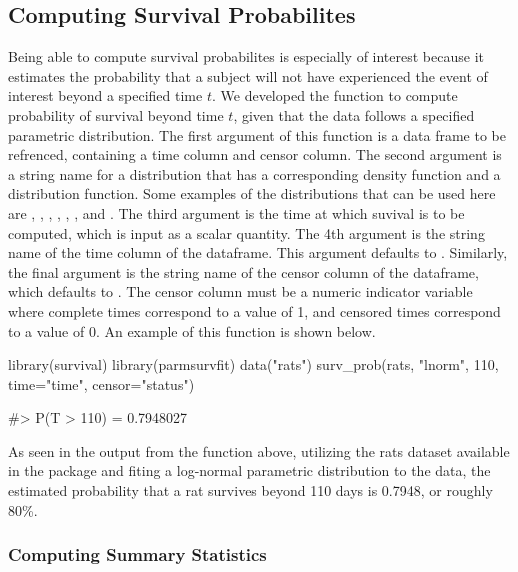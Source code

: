 \hypertarget{computing-survival-probabilites}{%
\subsection{Computing Survival
Probabilites}\label{computing-survival-probabilites}}

Being able to compute survival probabilites is especially of interest
because it estimates the probability that a subject will not have
experienced the event of interest beyond a specified time \(t\). We
developed the function  to compute probability of
survival beyond time \(t\), given that the data follows a specified
parametric distribution. The first argument of this function is a data
frame to be refrenced, containing a time column and censor column. The
second argument is a string name for a distribution that has a
corresponding density function and a distribution function. Some
examples of the distributions that can be used here are ,
, , , , ,
and . The third argument is the time at which suvival is
to be computed, which is input as a scalar quantity. The 4th argument is
the string name of the time column of the dataframe. This argument
defaults to . Similarly, the final argument is the string
name of the censor column of the dataframe, which defaults to
. The censor column must be a numeric indicator variable
where complete times correspond to a value of 1, and censored times
correspond to a value of 0. An example of this function is shown below.

\begin{Schunk}
\begin{Sinput}
library(survival)
library(parmsurvfit)
data("rats")
surv_prob(rats, "lnorm", 110, time="time", censor="status")
\end{Sinput}
\begin{Soutput}
#> P(T > 110) = 0.7948027
\end{Soutput}
\end{Schunk}

As seen in the output from the function above, utilizing the rats
dataset available in the  package and fiting a
log-normal parametric distribution to the data, the estimated
probability that a rat survives beyond 110 days is 0.7948, or roughly
80\%.

\hypertarget{computing-summary-statistics}{%
\subsubsection{Computing Summary
Statistics}\label{computing-summary-statistics}}

